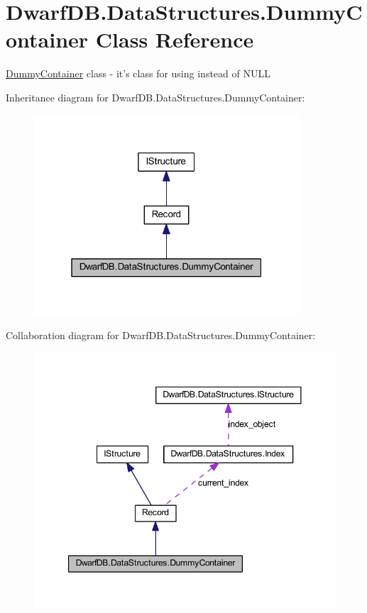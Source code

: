 \hypertarget{class_dwarf_d_b_1_1_data_structures_1_1_dummy_container}{\section{Dwarf\+D\+B.\+Data\+Structures.\+Dummy\+Container Class Reference}
\label{class_dwarf_d_b_1_1_data_structures_1_1_dummy_container}
}


\hyperlink{class_dwarf_d_b_1_1_data_structures_1_1_dummy_container}{Dummy\+Container} class -\/ it's class for using instead of N\+U\+L\+L  




Inheritance diagram for Dwarf\+D\+B.\+Data\+Structures.\+Dummy\+Container\+:
\nopagebreak
\begin{figure}[H]
\begin{center}
\leavevmode
\includegraphics[width=280pt]{class_dwarf_d_b_1_1_data_structures_1_1_dummy_container__inherit__graph}
\end{center}
\end{figure}


Collaboration diagram for Dwarf\+D\+B.\+Data\+Structures.\+Dummy\+Container\+:
\nopagebreak
\begin{figure}[H]
\begin{center}
\leavevmode
\includegraphics[width=347pt]{class_dwarf_d_b_1_1_data_structures_1_1_dummy_container__coll__graph}
\end{center}
\end{figure}
